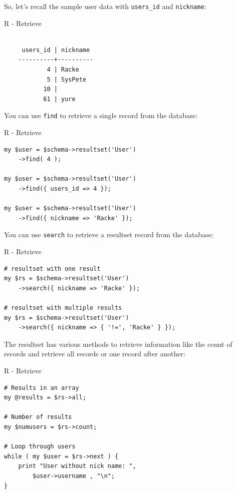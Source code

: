 So, let's recall the sample user data with
\verb|users_id| and \verb|nickname|:

\begin{frame}[fragile]{R - Retrieve}
\begin{lstlisting}

     users_id | nickname
    ----------+----------
            4 | Racke
            5 | SysPete
           10 |
           61 | yure

\end{lstlisting}
\end{frame}

You can use \verb|find| to retrieve a single record from
the database:

\begin{frame}[fragile]{R - Retrieve}
\begin{lstlisting}
my $user = $schema->resultset('User')
    ->find( 4 );

my $user = $schema->resultset('User')
    ->find({ users_id => 4 });

my $user = $schema->resultset('User')
    ->find({ nickname => 'Racke' });
\end{lstlisting}
\end{frame}


You can use \verb|search| to retrieve a resultset record from
the database:

\begin{frame}[fragile]{R - Retrieve}
\begin{lstlisting}
# resultset with one result
my $rs = $schema->resultset('User')
    ->search({ nickname => 'Racke' });

# resultset with multiple results
my $rs = $schema->resultset('User')
    ->search({ nickname => { '!=', 'Racke' } });
\end{lstlisting}
\end{frame}

The resultset has various methods to retrieve information
like the count of records and retrieve all records or
one record after another:

\begin{frame}[fragile]{R - Retrieve}
\begin{lstlisting}
# Results in an array
my @results = $rs->all;

# Number of results
my $numusers = $rs->count;

# Loop through users
while ( my $user = $rs->next ) {
    print "User without nick name: ",
        $user->username , "\n";
}
\end{lstlisting}
\end{frame}

